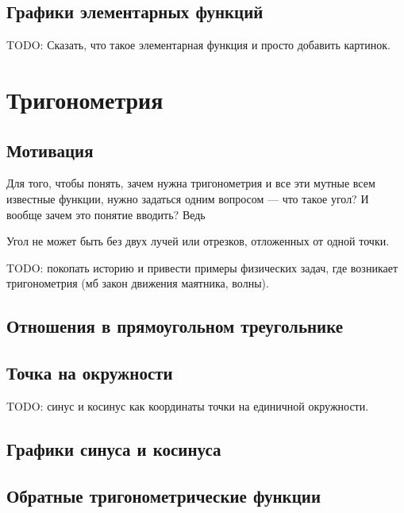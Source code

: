 \documentclass[a4paper,12pt]{article}
\begin{document}
\subsection*{Графики элементарных функций}

TODO: Сказать, что такое элементарная функция и просто добавить картинок.

\section*{Тригонометрия}
\subsection*{Мотивация}
Для того, чтобы понять, зачем нужна тригонометрия и все эти мутные всем известные функции, нужно задаться одним вопросом --- что такое угол? И вообще зачем это понятие вводить? Ведь 

Угол не может быть без двух лучей или отрезков, отложенных от одной точки. 

TODO: покопать историю и привести примеры физических задач, где возникает тригонометрия (мб закон движения маятника, волны).

\subsection*{Отношения в прямоугольном треугольнике}

\subsection*{Точка на окружности}
TODO: синус и косинус как координаты точки на единичной окружности.

\subsection*{Графики синуса и косинуса}

\subsection*{Обратные тригонометрические функции}
\end{document}
